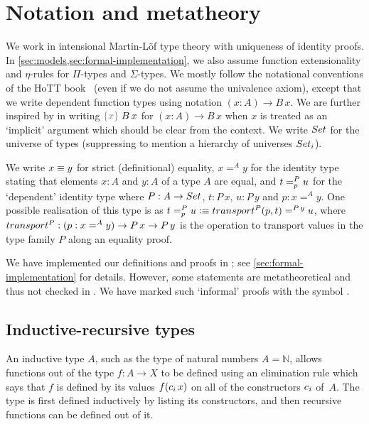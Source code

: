 \documentclass[a4paper,UKenglish,numberwithinsect,cleveref,thm-restate]{lipics-v2021}
\begin{document}

\section{Notation and metatheory} \label{sec:meta}

We work in intensional Martin-L\"of type theory with uniqueness of identity proofs. In \cref{sec:models,sec:formal-implementation}, we also assume function extensionality and $\eta$-rules for $\Pi$-types and $\Sigma$-types.
%
We mostly follow the notational conventions of the HoTT book~\cite{UFP2013} (even if we do not assume the univalence axiom), except that we write dependent function types using \Agda notation $(x : A) \to B\,x$.
%
We are further inspired by \Agda in writing $\implicit{x}\;B\,x$ for $(x : A) \to B\,x$ when $x$ is treated as an `implicit' argument which should be clear from the context.
We write $\Set$ for the universe of types (suppressing to mention a hierarchy of universes $\Set_i$).

We write $x \jdeq y$ for strict (definitional) equality, $x =^{A} y$ for the identity type stating that elements $x : A$ and $y : A$ of a type $A$ are equal, and $\dpath{P}{p}{t}{u}$ for the `dependent' identity type where $P : A \to \Set$, $t : P\,x$, $u : P\,y$ and $p : x =^A y$. One possible realisation of this type is as $t =^{P}_{p} u \defeq \transfib{P}{p}{t} =^{P\,y} u$, where $\transfibf{P} : (p : x =^A y) \to P\,x \to P\,y$ is the operation to transport values in the type family $P$ along an equality proof.
%

We have implemented our definitions and proofs in \Agda; see \cref{sec:formal-implementation} for details.
However, some statements are metatheoretical and thus not checked in \Agda. %
We have marked such `informal' proofs with the symbol \resizebox*{!}{\baselineskip}{\textdbend}.

\subsection{Inductive-recursive types}
An inductive type $A$, such as the type of natural numbers $A = \mathbb{N}$, allows functions out of the type $f : A \to X$ to be defined using an elimination rule which says that $f$ is defined by its values $f(\cc_i\,x)$ on all of the constructors $\cc_i$ of~$A$.
%
The type is first defined inductively by listing its constructors, and then recursive functions can be defined out of it.
\end{document}
